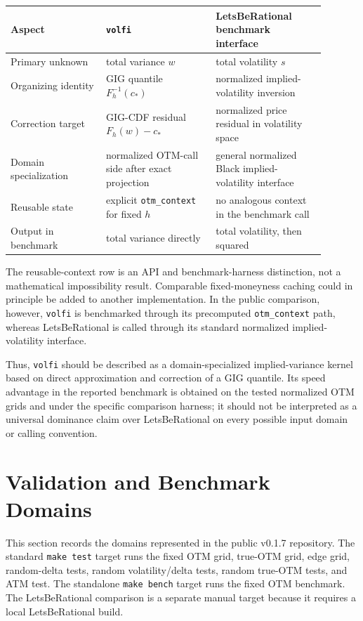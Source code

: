 \documentclass[11pt]{article}
\begin{document}
	\begin{center}
		\begin{tabular}{p{0.27\linewidth}p{0.31\linewidth}p{0.31\linewidth}}
			\toprule
			Aspect & \texttt{volfi} & LetsBeRational benchmark interface \\
			\midrule
			Primary unknown & total variance $w$ & total volatility $s$ \\
			Organizing identity & GIG quantile $F_h^{-1}(c_*)$ & normalized implied-volatility inversion \\
			Correction target & GIG-CDF residual $F_h(w)-c_*$ & normalized price residual in volatility space \\
			Domain specialization & normalized OTM-call side after exact projection & general normalized Black implied-volatility interface \\
			Reusable state & explicit \texttt{otm\_context} for fixed $h$ & no analogous context in the benchmark call \\
			Output in benchmark & total variance directly & total volatility, then squared \\
			\bottomrule
		\end{tabular}
	\end{center}
	
	The reusable-context row is an API and benchmark-harness distinction, not a mathematical impossibility result. Comparable fixed-moneyness caching could in principle be added to another implementation. In the public comparison, however, \texttt{volfi} is benchmarked through its precomputed \texttt{otm\_context} path, whereas LetsBeRational is called through its standard normalized implied-volatility interface.
	
	Thus, \texttt{volfi} should be described as a domain-specialized implied-variance kernel based on direct approximation and correction of a GIG quantile. Its speed advantage in the reported benchmark is obtained on the tested normalized OTM grids and under the specific comparison harness; it should not be interpreted as a universal dominance claim over LetsBeRational on every possible input domain or calling convention.
	
	\section{Validation and Benchmark Domains}
	
	This section records the domains represented in the public v0.1.7 repository. The standard \texttt{make test} target runs the fixed OTM grid, true-OTM grid, edge grid, random-delta tests, random volatility/delta tests, random true-OTM tests, and ATM test. The standalone \texttt{make bench} target runs the fixed OTM benchmark. The LetsBeRational comparison is a separate manual target because it requires a local LetsBeRational build.
	
\end{document}
